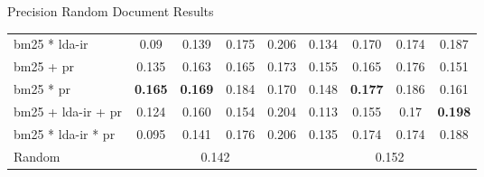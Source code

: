 \begin{frame}{\insertsection}{\insertsubsection}
\begin{block}{Precision Random Document Results}
\begin{table}
{\begin{tabular}{l|c|c|c|c||c|c|c|c}
					\acrshort{bm25} * \acrshort{lda}-\acrshort{ir} & 0.09 & 0.139 & 0.175& 0.206 & 0.134 & 0.170 & 0.174 & 0.187 \\
					\acrshort{bm25} + \acrshort{pr} & 0.135 & 0.163 & 0.165 & 0.173 & 0.155 & 0.165 & 0.176 & 0.151 \\
					\acrshort{bm25} * \acrshort{pr} & \textbf{0.165} & \textbf{0.169} & 0.184 & 0.170 & 0.148 & \textbf{0.177} & 0.186 & 0.161\\
					\acrshort{bm25} + \acrshort{lda}-\acrshort{ir} + \acrshort{pr} & 0.124 & 0.160 & 0.154 & 0.204 & 0.113 & 0.155 & 0.17 & \textbf{0.198}\\
					\acrshort{bm25} * \acrshort{lda}-\acrshort{ir} * \acrshort{pr} & 0.095 & 0.141 & 0.176 & 0.206 & 0.135 & 0.174 & 0.174 & 0.188\\
					\rowcolor{red!30}Random & \multicolumn{4}{c|}{0.142} & \multicolumn{4}{c|}{0.152} \\
				\end{tabular}
			}
		\end{table}
	\end{block}
\end{frame}

